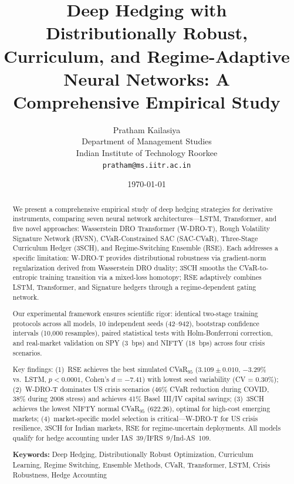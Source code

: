 \documentclass[11pt]{article}
\title{\textbf{Deep Hedging with Distributionally Robust, Curriculum, and Regime-Adaptive Neural Networks: A Comprehensive Empirical Study}}
\author{
Pratham Kailasiya \\
Department of Management Studies \\
Indian Institute of Technology Roorkee \\
\texttt{pratham@ms.iitr.ac.in}
}
\date{\today}
\begin{document}
\maketitle

\begin{abstract}
We present a comprehensive empirical study of deep hedging strategies for derivative instruments, comparing seven neural network architectures---LSTM, Transformer, and five novel approaches: Wasserstein DRO Transformer (W-DRO-T), Rough Volatility Signature Network (RVSN), CVaR-Constrained SAC (SAC-CVaR), Three-Stage Curriculum Hedger (3SCH), and Regime-Switching Ensemble (RSE). Each addresses a specific limitation: W-DRO-T provides distributional robustness via gradient-norm regularization derived from Wasserstein DRO duality; 3SCH smooths the CVaR-to-entropic training transition via a mixed-loss homotopy; RSE adaptively combines LSTM, Transformer, and Signature hedgers through a regime-dependent gating network.

Our experimental framework ensures scientific rigor: identical two-stage training protocols across all models, 10 independent seeds (42--942), bootstrap confidence intervals (10,000 resamples), paired statistical tests with Holm-Bonferroni correction, and real-market validation on SPY (3~bps) and NIFTY (18~bps) across four crisis scenarios.

Key findings: (1)~RSE achieves the best simulated CVaR$_{95}$ ($3.109 \pm 0.010$, $-3.29\%$ vs.\ LSTM, $p < 0.0001$, Cohen's $d = -7.41$) with lowest seed variability (CV = 0.30\%); (2)~W-DRO-T dominates US crisis scenarios (46\% CVaR reduction during COVID, 38\% during 2008 stress) and achieves 41\% Basel~III/IV capital savings; (3)~3SCH achieves the lowest NIFTY normal CVaR$_{95}$ (622.26), optimal for high-cost emerging markets; (4)~market-specific model selection is critical---W-DRO-T for US crisis resilience, 3SCH for Indian markets, RSE for regime-uncertain deployments. All models qualify for hedge accounting under IAS~39/IFRS~9/Ind-AS~109.

\smallskip
\noindent\textbf{Keywords:} Deep Hedging, Distributionally Robust Optimization, Curriculum Learning, Regime Switching, Ensemble Methods, CVaR, Transformer, LSTM, Crisis Robustness, Hedge Accounting
\end{abstract}

\end{document}
